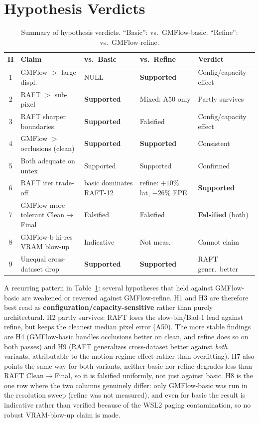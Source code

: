 \documentclass[11pt,a4paper]{article}
\let\origsection\section
\renewcommand{\section}{\FloatBarrier\origsection}
\begin{document}
\section{Hypothesis Verdicts}

\begin{table}[htbp]
\centering
\caption{Summary of hypothesis verdicts. ``Basic'': vs.\ GMFlow-basic.
  ``Refine'': vs.\ GMFlow-refine.}
\label{tab:hypotheses}
\small
\setlength{\tabcolsep}{3pt}
\begin{tabular}{cllll}
\toprule
H & Claim & vs.\ Basic & vs.\ Refine & Verdict \\
\midrule
1 & GMFlow $>$ large displ. & NULL & \textbf{Supported} & Config/capacity effect \\
2 & RAFT $>$ sub-pixel & \textbf{Supported} & Mixed: A50 only & Partly survives \\
3 & RAFT sharper boundaries & \textbf{Supported} & Falsified & Config/capacity effect \\
4 & GMFlow $>$ occlusions (clean) & \textbf{Supported} & \textbf{Supported} & Consistent \\
5 & Both adequate on untex & Supported & Supported & Confirmed \\
6 & RAFT iter trade-off & basic dominates RAFT-12 & refine: $+10\%$ lat, $-26\%$ EPE & \textbf{Supported} \\
7 & GMFlow more tolerant Clean$\to$Final & Falsified & Falsified & \textbf{Falsified} (both) \\
8 & GMFlow-b hi-res VRAM blow-up & Indicative & Not meas. & Cannot claim \\
9 & Unequal cross-dataset drop & \textbf{Supported} & \textbf{Supported} & RAFT gener.\ better \\
\midrule
\end{tabular}
\end{table}

A recurring pattern in Table~\ref{tab:hypotheses}: several hypotheses
that held against GMFlow-basic are weakened or reversed against
GMFlow-refine.  H1 and H3 are therefore best read as
\textbf{configuration/capacity-sensitive} rather than purely architectural.
H2 partly survives: RAFT loses the slow-bin/Bad-1 lead against refine,
but keeps the cleanest median pixel error (A50).  The more
stable findings are H4 (GMFlow-basic handles occlusions better on clean,
and refine does so on both passes) and H9 (RAFT generalizes cross-dataset
better against \emph{both} variants, attributable to the motion-regime
effect rather than overfitting).  H7 also points the same way for both
variants, neither basic nor refine degrades less than RAFT
Clean$\to$Final, so it is falsified uniformly, not just against basic.
H8 is the one row where the two columns genuinely differ: only
GMFlow-basic was run in the resolution sweep (refine was not measured),
and even for basic the result is indicative rather than verified because
of the WSL2 paging contamination, so no robust VRAM-blow-up claim is
made.
\end{document}
